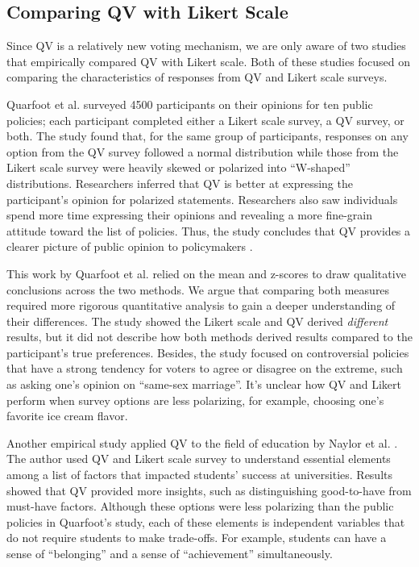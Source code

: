 \subsection{Comparing QV with Likert Scale}
Since QV is a relatively new voting mechanism, we are only aware of two studies that empirically compared QV with Likert scale. Both of these studies focused on comparing the characteristics of responses from QV and Likert scale surveys.

Quarfoot et al. \cite{quarfoot2017quadratic} surveyed 4500 participants on their opinions for ten public policies; each participant completed either a Likert scale survey, a QV survey, or both.  The study found that, for the same group of participants, responses on any option from the QV survey followed a normal distribution while those from the Likert scale survey were heavily skewed or polarized into ``W-shaped'' distributions. Researchers inferred that QV is better at expressing the participant's opinion for polarized statements. Researchers also saw individuals spend more time expressing their opinions and revealing a more fine-grain attitude toward the list of policies. Thus, the study concludes that QV provides a clearer picture of public opinion to policymakers \cite{quarfoot2017quadratic}.

This work by Quarfoot et al. relied on the mean and z-scores to draw qualitative conclusions across the two methods. We argue that comparing both measures required more rigorous quantitative analysis to gain a deeper understanding of their differences. The study showed the Likert scale and QV derived \textit{different} results, but it did not describe how both methods derived results compared to the participant's true preferences. Besides, the study focused on controversial policies that have a strong tendency for voters to agree or disagree on the extreme, such as asking one's opinion on ``same-sex marriage''. It's unclear how QV and Likert perform when survey options are less polarizing, for example, choosing one's favorite ice cream flavor.\par

Another empirical study applied QV to the field of education by Naylor et al. \cite{naylor2017first}. The author used QV and Likert scale survey to understand essential elements among a list of factors that impacted students' success at universities. Results showed that QV provided more insights, such as distinguishing good-to-have from must-have factors. Although these options were less polarizing than the  public policies in Quarfoot's study, each of these elements is independent variables that do not require students to make trade-offs. For example, students can have a sense of ``belonging'' and a sense of ``achievement'' simultaneously.

